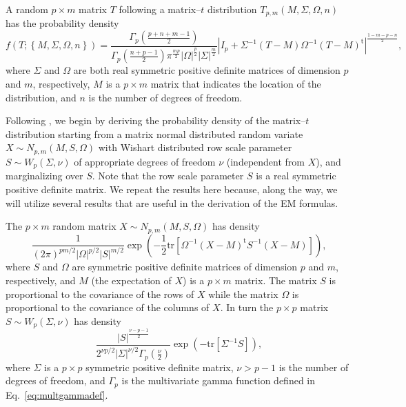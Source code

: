 \documentclass[english,listof=totoc]{scrartcl}
\begin{document}
A random $p\times m$ matrix $T$ following a matrix--$t$ distribution
$T_{p,m}(M,\Sigma,\Omega,n)$ has the probability density
\begin{equation}
f(T;\left\{M,\Sigma,\Omega,n\right\})=\frac{\Gamma_{p}\left(\frac{p+n+m-1}{2}\right)}{\Gamma_{p}\left(\frac{n+p-1}{2}\right)\pi^{\frac{mp}{2}}|\Omega|^{\frac{p}{2}}|\Sigma|^{\frac{m}{2}}}
|I_p+\Sigma^{-1}(T-M)\Omega^{-1}(T-M)^{\textrm{t}}|^{\frac{1-m-p-n}{2}},
\label{eq:matrixtpdf}
\end{equation}
where $\Sigma$ and $\Omega$ are both real symmetric positive definite
matrices of dimension $p$ and $m$, respectively, $M$ is a $p\times m$
matrix that indicates the location of the distribution, and $n$ is the
number of degrees of freedom.

Following \citet{gupta1999matrix}, we begin by deriving the
probability density of the matrix--$t$ distribution starting from
a matrix normal distributed random variate $X\sim N_{p,m}(M,S,\Omega)$
with Wishart distributed row scale parameter $S \sim W_{p}\left(\Sigma,\nu\right)$ of appropriate degrees of freedom $\nu$ (independent from $X$), and marginalizing over $S$. Note that the row scale
parameter $S$ is a real symmetric positive definite matrix. We repeat the results here because, along the way, we will utilize several results that are useful in the derivation of the EM formulas.

The $p\times m$ random matrix $X \sim N_{p,m}(M,S,\Omega)$ has density
\begin{equation}
	\frac{1}{(2\pi)^{pm/2}|\Omega|^{p/2}|S|^{m/2}}\exp\left(-\frac{1}{2}\textrm{tr}\left[\Omega^{-1}(X-M)^{\textrm{t}}S^{-1}(X-M)\right]\right),\label{eq:ndistpdf}
\end{equation}
where $S$ and $\Omega$ are symmetric positive definite matrices of dimension $p$ and $m$, respectively, and $M$ (the expectation of $X$) is a $p\times m$ matrix. The matrix $S$ is proportional to the covariance of the rows of $X$ while the matrix $\Omega$ is proportional to the covariance of the columns of $X$. In turn the $p\times p$ matrix $S\sim W_{p}\left(\Sigma,\nu\right)$ has density
\begin{equation}
\frac{|S|^{\frac{\nu-p-1}{2}}}{2^{\nu p/2}|\Sigma|^{\nu/2}\Gamma_{p}(\frac{\nu}{2})}\exp\left(-\textrm{tr}\left[\Sigma^{-1}S\right]\right),\label{eq:wdistpdf}
\end{equation}
where $\Sigma$ is a $p\times p$ symmetric positive definite matrix, $\nu>p-1$
is the number of degrees of freedom, and $\Gamma_{p}$ is the
multivariate gamma function defined in Eq.~\eqref{eq:multgammadef}.
\end{document}
